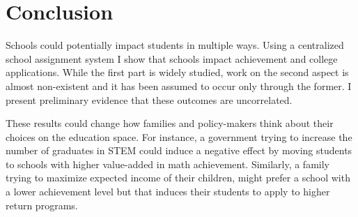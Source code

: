 \documentclass[12pt]{article}
\begin{document}
\section{Conclusion}

Schools could potentially impact students in multiple ways. Using a centralized school assignment system I show that schools impact achievement and college applications. While the first part is widely studied, work on the second aspect is almost non-existent and it has been assumed to occur only through the former. I present preliminary evidence that these outcomes are uncorrelated. 

These results could change how families and policy-makers think about their choices on the education space. For instance, a government trying to increase the number of graduates in STEM could induce a negative effect by moving students to schools with higher value-added in math achievement. Similarly, a family trying to maximize expected income of their children, might prefer a school with a lower achievement level but that induces their students to apply to higher return programs. 


\clearpage
\printbibliography
\end{document}
